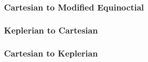 \subsubsection{Cartesian to Modified Equinoctial\label{rec2mee}}

\subsubsection{Keplerian to Cartesian\label{kep2rec}}

\subsubsection{Cartesian to Keplerian\label{rec2kep}}

